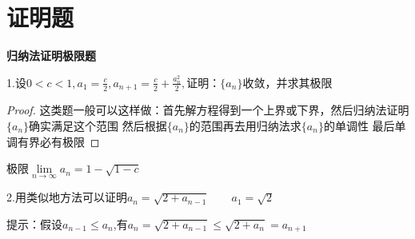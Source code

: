 \documentclass[12pt, a4paper]{ctexart}
\begin{document}
\section{证明题}
    \begin{flushleft}
    
    {\bfseries 归纳法证明极限题}

    1.设$0<c<1,a_1 = \frac{c}{2},a_{n+1}=\frac{c}{2}+\frac{a_n^2}{2},$证明：$\{a_n\}$收敛，并求其极限
    \begin{proof} %
    这类题一般可以这样做：首先解方程得到一个上界或下界，然后归纳法证明$\{a_n\}$确实满足这个范围
    然后根据$\{a_n\}$的范围再去用归纳法求$\{a_n\}$的单调性
    最后单调有界必有极限
    \end{proof}
    极限$\lim \limits _{n \rightarrow \infty} a_n = 1 - \sqrt{1-c}$


    2.用类似地方法可以证明$a_n = \sqrt{2 + a_{n-1}}\qquad a_1=\sqrt{2}$

    提示：假设$a_{n-1} \leq a_{n}$,有$a_n = \sqrt{2+a_{n-1}} \leq \sqrt{2+a_{n} }= a_{n+1}$
    \end{flushleft}
\end{document}
